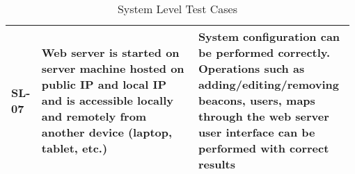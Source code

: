 \begin{table}[h!]
\begin{tabular}{|p{0.075\linewidth}|p{0.45\linewidth}|p{0.45\linewidth}|}
    \hline
    SL-07
    & Web server is started on server machine hosted on public IP and local IP and  is accessible locally and remotely from another device (laptop, tablet, etc.)
    & System configuration can be performed correctly. Operations such as adding/editing/removing beacons, users, maps through the web server user interface can be performed with correct results\\ 

    \hline
    \end{tabular}
    \caption{System Level Test Cases}
\end{table}















